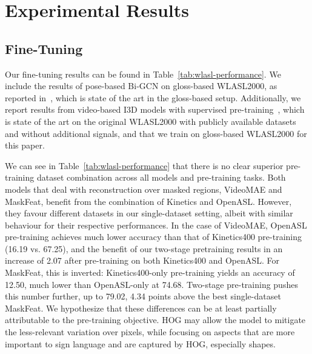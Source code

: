 \section{Experimental Results}
\label{sec:experimental-results}

\subsection{Fine-Tuning}
\label{sec:experimental-results-fine-tuning}

Our fine-tuning results can be found in Table~\ref{tab:wlasl-performance}. We include the results of pose-based Bi-GCN on gloss-based WLASL2000, as reported in~\cite{Dafnis2022Bidirectional}, which is state of the art in the gloss-based setup. Additionally, we report results from video-based I3D models with supervised pre-training~\cite{Albanie2020BSL1K, Varol2021BSL1KImp}, which is state of the art on the original WLASL2000 with publicly available datasets and without additional signals, and that we train on gloss-based WLASL2000 for this paper.

We can see in Table~\ref{tab:wlasl-performance} that there is no clear superior pre-training dataset combination across all models and pre-training tasks. Both models that deal with reconstruction over masked regions, VideoMAE and MaskFeat, benefit from the combination of Kinetics and OpenASL. However, they favour different datasets in our single-dataset setting, albeit with similar behaviour for their respective performances. In the case of VideoMAE, OpenASL pre-training achieves much lower accuracy than that of Kinetics400 pre-training (16.19 vs. 67.25), and the benefit of our two-stage pretraining results in an increase of 2.07 after pre-training on both Kinetics400 and OpenASL. For MaskFeat, this is inverted: Kinetics400-only pre-training yields an accuracy of 12.50, much lower than OpenASL-only at 74.68. Two-stage pre-training pushes this number further, up to 79.02, 4.34 points above the best single-dataset MaskFeat. We hypothesize that these differences can be at least partially attributable to the pre-training objective. HOG may allow the model to mitigate the less-relevant variation over pixels, while focusing on aspects that are more important to sign language and are captured by HOG, especially shapes.

